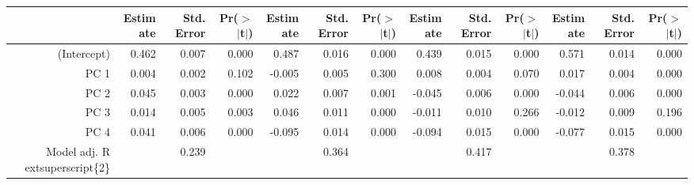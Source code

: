 \begin{table}[ht]
\centering
\begin{tabular}{rrrrrrrrrrrrr}
  \hline
 & Estimate & Std. Error & Pr($>$$|$t$|$) & Estimate & Std. Error & Pr($>$$|$t$|$) & Estimate & Std. Error & Pr($>$$|$t$|$) & Estimate & Std. Error & Pr($>$$|$t$|$) \\ 
  \hline
(Intercept) & 0.462 & 0.007 & 0.000 & 0.487 & 0.016 & 0.000 & 0.439 & 0.015 & 0.000 & 0.571 & 0.014 & 0.000 \\ 
  PC 1 & 0.004 & 0.002 & 0.102 & -0.005 & 0.005 & 0.300 & 0.008 & 0.004 & 0.070 & 0.017 & 0.004 & 0.000 \\ 
  PC 2 & 0.045 & 0.003 & 0.000 & 0.022 & 0.007 & 0.001 & -0.045 & 0.006 & 0.000 & -0.044 & 0.006 & 0.000 \\ 
  PC 3 & 0.014 & 0.005 & 0.003 & 0.046 & 0.011 & 0.000 & -0.011 & 0.010 & 0.266 & -0.012 & 0.009 & 0.196 \\ 
  PC 4 & 0.041 & 0.006 & 0.000 & -0.095 & 0.014 & 0.000 & -0.094 & 0.015 & 0.000 & -0.077 & 0.015 & 0.000 \\ 
  Model adj. R	extsuperscript\{2\} &  & 0.239 &  &  & 0.364 &  &  & 0.417 &  &  & 0.378 &  \\ 
   \hline
\end{tabular}
\end{table}
